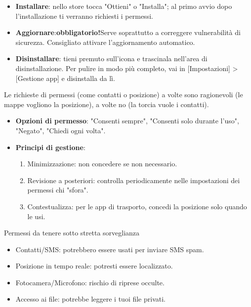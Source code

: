 \begin{itemize}
  \item \textbf{Installare}: nello store tocca "Ottieni" o "Installa"; al primo avvio dopo l'installazione ti verranno richiesti i permessi.
  \item \textbf{Aggiornare}:\textbf{obbligatorio!}Serve soprattutto a correggere vulnerabilità di sicurezza. Consigliato attivare l'aggiornamento automatico.
  \item \textbf{Disinstallare}: tieni premuto sull'icona e trascinala nell'area di disinstallazione. Per pulire in modo più completo, vai in [Impostazioni] > [Gestione app] e disinstalla da lì.
\end{itemize}


Le richieste di permessi (come contatti o posizione) a volte sono ragionevoli (le mappe vogliono la posizione), a volte no (la torcia vuole i contatti).

\begin{itemize}
  \item \textbf{Opzioni di permesso}: "Consenti sempre", "Consenti solo durante l'uso", "Negato", "Chiedi ogni volta".
  \item \textbf{Principi di gestione}:
  \begin{enumerate}
    \item Minimizzazione: non concedere se non necessario.
    \item Revisione a posteriori: controlla periodicamente nelle impostazioni dei permessi chi "sfora".
    \item Contestualizza: per le app di trasporto, concedi la posizione solo quando le usi.
  \end{enumerate}
\end{itemize}

\begin{tcbwarn}{Permessi da tenere sotto stretta sorveglianza}
\begin{itemize}
  \item Contatti/SMS: potrebbero essere usati per inviare SMS spam.
  \item Posizione in tempo reale: potresti essere localizzato.
  \item Fotocamera/Microfono: rischio di riprese occulte.
  \item Accesso ai file: potrebbe leggere i tuoi file privati.
\end{itemize}

\end{tcbwarn}

